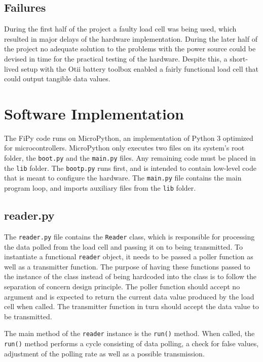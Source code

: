 \subsection{Failures}
During the first half of the project a faulty load cell was being used, which resulted in major delays of the hardware implementation. During the later half of the project no adequate solution to the problems with the power source could be devised in time for the practical testing of the hardware. Despite this, a short-lived setup with the Otii battery toolbox enabled a fairly functional load cell that could output tangible data values.




\section{Software Implementation}
The FiPy code runs on MicroPython, an implementation of Python 3 optimized for microcontrollers. MicroPython only executes two files on its system's root folder, the \lstinline{boot.py} and the \lstinline{main.py} files. Any remaining code must be placed in the \lstinline{lib} folder. The \lstinline{bootp.py} runs first, and is intended to contain low-level code that is meant to configure the hardware. The \lstinline{main.py} file contains the main program loop, and imports auxiliary files from the \lstinline{lib} folder.

\subsection{reader.py}
The \lstinline{reader.py} file contains the \lstinline{Reader} class, which is responsible for processing the data polled from the load cell and passing it on to being transmitted. To instantiate a functional \lstinline{reader} object, it needs to be passed a poller function as well as a transmitter function. The purpose of having these functions passed to the instance of the class instead of being hardcoded into the class is to follow the separation of concern design principle.\cite{sep-concern} The poller function should accept no argument and is expected to return the current data value produced by the load cell when called. The transmitter function in turn should accept the data value to be transmitted.

The main method of the \lstinline{reader} instance is the \lstinline{run()} method. When called, the \lstinline{run()} method performs a cycle consisting of data polling, a check for false values, adjustment of the polling rate as well as a possible transmission. 

